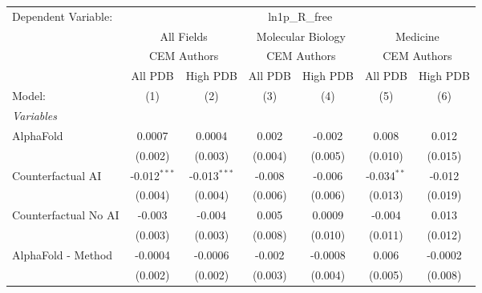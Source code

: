 \begingroup
\centering
\begin{tabular}{lcccccc}
   \tabularnewline \midrule \midrule
   Dependent Variable: & \multicolumn{6}{c}{ln1p\_R\_free}\\
 & \multicolumn{2}{c}{All Fields} & \multicolumn{2}{c}{Molecular Biology} & \multicolumn{2}{c}{Medicine} \\
\cmidrule(lr){2-3} \cmidrule(lr){4-5} \cmidrule(lr){6-7}
 & \multicolumn{2}{c}{CEM Authors} & \multicolumn{2}{c}{CEM Authors} & \multicolumn{2}{c}{CEM Authors} \\
\cmidrule(lr){2-3} \cmidrule(lr){4-5} \cmidrule(lr){6-7}
 & \multicolumn{1}{c}{All PDB} & \multicolumn{1}{c}{High PDB} & \multicolumn{1}{c}{All PDB} & \multicolumn{1}{c}{High PDB} & \multicolumn{1}{c}{All PDB} & \multicolumn{1}{c}{High PDB} \\
\cmidrule(lr){2-2} \cmidrule(lr){3-3} \cmidrule(lr){4-4} \cmidrule(lr){5-5} \cmidrule(lr){6-6} \cmidrule(lr){7-7}
   Model:                                                     & (1)            & (2)            & (3)          & (4)      & (5)           & (6)\\  
   \midrule
   \emph{Variables}\\
   AlphaFold                                                  & 0.0007         & 0.0004         & 0.002        & -0.002   & 0.008         & 0.012\\   
                                                              & (0.002)        & (0.003)        & (0.004)      & (0.005)  & (0.010)       & (0.015)\\   
   Counterfactual AI                                          & -0.012$^{***}$ & -0.013$^{***}$ & -0.008       & -0.006   & -0.034$^{**}$ & -0.012\\   
                                                              & (0.004)        & (0.004)        & (0.006)      & (0.006)  & (0.013)       & (0.019)\\   
   Counterfactual No AI                                       & -0.003         & -0.004         & 0.005        & 0.0009   & -0.004        & 0.013\\   
                                                              & (0.003)        & (0.003)        & (0.008)      & (0.010)  & (0.011)       & (0.012)\\   
   AlphaFold - Method                                         & -0.0004        & -0.0006        & -0.002       & -0.0008  & 0.006         & -0.0002\\   
                                                              & (0.002)        & (0.002)        & (0.003)      & (0.004)  & (0.005)       & (0.008)\\   

\end{tabular}
